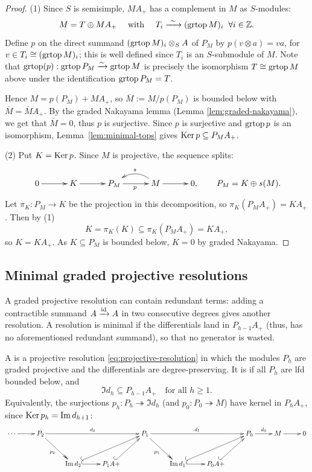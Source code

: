 \begin{proof}
(1) Since $S$ is semisimple, $MA_+$ has a complement in $M$ as  $S$-modules:
\[
M=T\oplus MA_+ \quad \text{ with }\quad  T_i\xrightarrow{\ \sim\ }(\operatorname{grtop}\nolimits M)_i \;\; \forall i\in\mathbb{Z}.
\]
Define $p$ on the direct summand $(\operatorname{grtop}\nolimits M)_i\otimes_S A$ of $P_M$ by $p(v\otimes a)=va$, for $v\in T_i\cong(\operatorname{grtop}\nolimits M)_i$; this is well defined since $T_i$ is an $S$-submodule of $M$.
Note that $\operatorname{grtop}\nolimits(p):\operatorname{grtop}\nolimits P_M \xrightarrow{\sim} \operatorname{grtop}\nolimits M$ is precisely the isomorphism $T\cong\operatorname{grtop}\nolimits M$ above under the identification $\operatorname{grtop}\nolimits P_M=T$.

Hence $M=p(P_M)+MA_+$, so $\overline{M}:=M/p(P_M)$ is bounded below with $\overline{M}=\overline{M}A_+$.  By the graded Nakayama lemma (Lemma \ref{lem:graded-nakayama}), we get that $\overline{M}=0$, thus $p$ is surjective.
Since $p$ is surjective and $\operatorname{grtop}\nolimits p$ is an isomorphism, Lemma~\ref{lem:minimal-tops} gives $\operatorname{Ker}\nolimits p\subseteq P_MA_+$.

(2) Put $K=\operatorname{Ker}\nolimits p$.
Since $M$ is projective, the sequence splits:
\[
\xymatrix@C=30pt{
0\ar[r] & K\ar[r] & P_M\ar[r]_p & M\ar[r]\ar@/_1pc/[l]_{s} & 0,
}
\qquad P_M=K\oplus s(M).
\]
Let $\pi_K:P_M\to K$ be the projection in this decomposition, so $\pi_K(P_MA_+)=KA_+$.
Then by (1)
\[
K=\pi_K(K)\subseteq\pi_K(P_MA_+)=KA_+,
\]
so $K=KA_+$.
As $K\subseteq P_M$ is bounded below, $K=0$ by graded Nakayama.
\end{proof}

\subsection{Minimal graded projective resolutions}

A graded projective resolution can contain redundant terms: adding a contractible summand $A\xrightarrow{\operatorname{id}}A$ in two consecutive degrees gives another resolution.
A resolution is minimal if the differentials land in $P_{h-1}A_+$ (thus, has no aforementioned redundant summand), so that no generator is wasted.

\begin{definition}\label{def:minimal-resolution}
A  is a projective resolution \eqref{eq:projective-resolution} in which the modules $P_h$ are graded projective and the differentials are degree-preserving.
It is  if all $P_h$ are lfd bounded below, and 
\begin{equation}\label{eq:graded-minimal-criterion}
\Im d_h\subseteq P_{h-1}A_+\quad\text{for all }h\geq1.
\end{equation}
Equivalently, the surjections $p_h:P_h\twoheadrightarrow\Im d_h$ (and $p_0:P_0\twoheadrightarrow M$) have kernel in $P_hA_+$, since $\operatorname{Ker}\nolimits p_h=\operatorname{Im}\nolimits d_{h+1}$:
\[
\xymatrix@C=25pt@R=30pt{
\cdots\ar[r] & P_2\ar[rrr]^{d_2}\ar@{->>}[dr]_{p_2} & & & P_1\ar[rrr]^{d_1}\ar@{->>}[dr]_{p_1} & & & P_0\ar[r]^{d_0} & M\ar[r] & 0\\
& & \Im d_2\ar@{^{(}->}[urr] \ar@{^{(}->}[r] & P_1A+\ar@{^{(}->}[ur]& & \Im d_1\ar@{^{(}->}[urr]\ar@{^{(}->}[r] & P_0A+\ar@{^{(}->}[ur]& &
}
\]
\end{definition}

